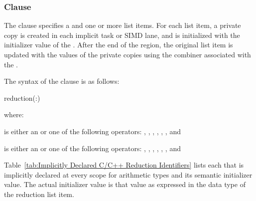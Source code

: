 \subsubsection{ Clause}
\label{subsubsec:reduction clause}
\summary
The  clause specifies a  and one or more list items. For 
each list item, a private copy is created in each implicit task or SIMD lane, and is 
initialized with the initializer value of the . After the end of the 
region, the original list item is updated with the values of the private copies using the 
combiner associated with the .

\syntax
\ccppspecificstart %
The syntax of the  clause is as follows:

\begin{boxedcode}
reduction(:)
\end{boxedcode}

where:

\cspecificstart %
 is either an  or one of the following operators:
\code{+},
\code{-},
\code{*}, 
\code{\&},
\code{|},
\code{\^},
\code{\&\&} and
\code{||}
\cspecificend %

\cppspecificstart %
 is either an  or one of the following operators:
\code{+},
\code{-},
\code{*}, 
\code{\&},
\code{|},
\code{\^},
\code{\&\&} and
\code{||}
\cppspecificend %

Table~\ref{tab:Implicitly Declared C/C++ Reduction Identifiers} lists each 
 that is implicitly declared at every 
scope for arithmetic types and its semantic initializer value. The actual initializer value 
is that value as expressed in the data type of the reduction list item.


